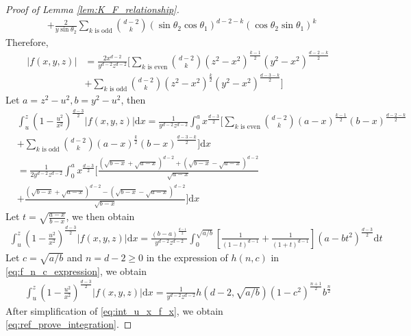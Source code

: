 \documentclass{aptpub}
\def\d{\mathrm{d}}
\begin{document}
\begin{proof}[Proof of Lemma \ref{lem:K_F_relationship}]
\begin{align*}
&+\frac{2}{y\sin\theta_2} \sum_{k \textrm{ is odd}}
\binom{d-2}{k} (\sin\theta_2\cos\theta_1)^{d-2-k}
(\cos\theta_2 \sin\theta_1)^k
\end{align*}
Therefore,
\begin{align*}
|f(x,y,z)|
&= \frac{2x^{d-2}}{y^{d-2}z^{d-2}}
\Big[
     \sum_{k \textrm{ is even}}
     \binom{d-2}{k} (z^2-x^2)^{\frac{k-1}{2}}
     (y^2-x^2)^{\frac{d-2-k}{2}}\\
    &+ \sum_{k \textrm{ is odd}}
    \binom{d-2}{k}    (z^2-x^2)^{\frac{k}{2}}
    (y^2-x^2)^{\frac{d-3-k}{2}}
\Big]
\end{align*}
Let $a=z^2-u^2, b=y^2-u^2$, then
\begin{align*}
     &\int_u^z (1-\frac{u^2}{x^2})^{\frac{d-3}{2}}
     |f(x,y,z)|\d x
     =\frac{1}{y^{d-2}z^{d-2}}
     \int_0^a x^{\frac{d-3}{2}}\Big[\sum_{k \textrm{ is even}}
     \binom{d-2}{k} (a-x)^{\frac{k-1}{2}}
     (b-x)^{\frac{d-2-k}{2}}\\
     &+ \sum_{k \textrm{ is odd}}
     \binom{d-2}{k} (a-x)^{\frac{k}{2}}
     (b-x)^{\frac{d-3-k}{2}}
     \Big]\d x\\
     &=\frac{1}{2y^{d-2}z^{d-2}}
     \int_0^a x^{\frac{d-3}{2}}\Big[\frac{(\sqrt{b-x} + \sqrt{a-x})^{d-2}+(\sqrt{b-x} - \sqrt{a-x})^{d-2}}{\sqrt{a-x}}\\
     &+\frac{(\sqrt{b-x} + \sqrt{a-x})^{d-2}-(\sqrt{b-x} - \sqrt{a-x})^{d-2}}{\sqrt{b-x}}\Big] \d x
\end{align*}
Let $t=\sqrt{\frac{a-x}{b-x}}$, we then obtain
\begin{align*}
     \int_u^z (1-\frac{u^2}{x^2})^{\frac{d-3}{2}}
     |f(x,y,z)|\d x
     =\frac{(b-a)^{\frac{d-1}{2}}}{y^{d-2}z^{d-2}}\int_0^{\sqrt{a/b}}
     \left[\frac{1}{(1-t)^{d-1}}+\frac{1}{(1+t)^{d-1}}\right](a-bt^2)^{\frac{d-3}{2}}\d t
\end{align*}
Let $c=\sqrt{a/b}$ and $n=d-2\geq 0$ in the expression of $h(n,c)$ in \eqref{eq:f_n_c_expression},
we obtain
\begin{align}\label{eq:int_u_x_f_x}
     \int_u^z (1-\frac{u^2}{x^2})^{\frac{d-3}{2}}
     |f(x,y,z)|\d x
     = \frac{1}{y^{d-2}z^{d-2}}h(d-2, \sqrt{a/b}) (1-c^2)^{\frac{n+1}{2}}b^{\frac{n}{2}}
\end{align}
After simplification of \eqref{eq:int_u_x_f_x}, we obtain \eqref{eq:ref_prove_integration}.
\end{proof}
\end{document}
